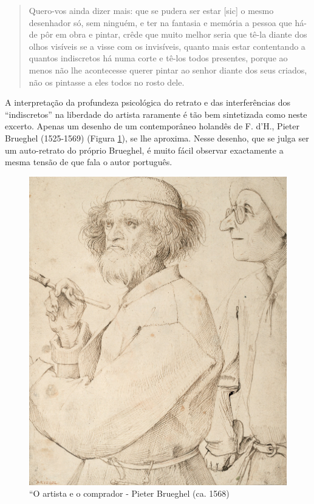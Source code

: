 \documentclass{article}
\begin{document}
\begin{quote}
  Quero-vos ainda dizer mais: que se pudera ser estar [sic] o mesmo
  desenhador só, sem ninguém, e ter na fantasia e memória a pessoa que
  há-de pôr em obra e pintar, crêde que muito melhor seria que tê-la
  diante dos olhos visíveis se a visse com os invisíveis, quanto mais
  estar contentando a quantos indiscretos há numa corte e tê-los todos
  presentes, porque ao menos não lhe acontecesse querer pintar ao
  senhor diante dos seus criados, não os pintasse a eles todos no
  rosto dele.
\end{quote}

A interpretação da profundeza psicológica do retrato e das
interferências dos ``indiscretos'' na liberdade do artista raramente é
tão bem sintetizada como neste excerto. Apenas um desenho de um
contemporâneo holandês de F. d'H., Pieter Brueghel (1525-1569) (Figura
\ref{fig:1}), se lhe aproxima. Nesse desenho, que se julga ser um
auto-retrato do próprio Brueghel, é muito fácil observar exactamente a
mesma tensão de que fala o autor português.

\begin{figure}
\centering\includegraphics[height=0.7\textheight,keepaspectratio]
                          {images/brueghel.jpg}
  \caption{``O artista e o comprador - Pieter Brueghel (ca. 1568)}
  \label{fig:1}
\end{figure}
\end{document}
